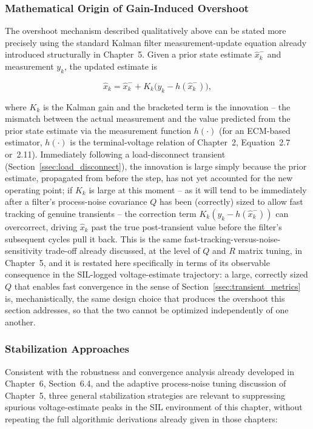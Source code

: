 \subsubsection{Mathematical Origin of Gain-Induced Overshoot}

The overshoot mechanism described qualitatively above can be stated more precisely using the standard Kalman filter measurement-update equation already introduced structurally in Chapter~5. Given a prior state estimate $\hat{x}_k^-$ and measurement $y_k$, the updated estimate is

\begin{equation}
	\hat{x}_k = \hat{x}_k^- + K_k \big(y_k - h(\hat{x}_k^-)\big),
	\label{eq:kf_update}
\end{equation}

\noindent where $K_k$ is the Kalman gain and the bracketed term is the innovation -- the mismatch between the actual measurement and the value predicted from the prior state estimate via the measurement function $h(\cdot)$ (for an ECM-based estimator, $h(\cdot)$ is the terminal-voltage relation of Chapter~2, Equation~2.7 or~2.11). Immediately following a load-disconnect transient (Section~\ref{ssec:load_disconnect}), the innovation is large simply because the prior estimate, propagated from before the step, has not yet accounted for the new operating point; if $K_k$ is large at this moment -- as it will tend to be immediately after a filter's process-noise covariance $Q$ has been (correctly) sized to allow fast tracking of genuine transients -- the correction term $K_k(y_k - h(\hat{x}_k^-))$ can overcorrect, driving $\hat{x}_k$ past the true post-transient value before the filter's subsequent cycles pull it back. This is the same fast-tracking-versus-noise-sensitivity trade-off already discussed, at the level of $Q$ and $R$ matrix tuning, in Chapter~5, and it is restated here specifically in terms of its observable consequence in the SIL-logged voltage-estimate trajectory: a large, correctly sized $Q$ that enables fast convergence in the sense of Section~\ref{ssec:transient_metrics} is, mechanistically, the same design choice that produces the overshoot this section addresses, so that the two cannot be optimized independently of one another.

\subsubsection{Stabilization Approaches}

Consistent with the robustness and convergence analysis already developed in Chapter~6, Section~6.4, and the adaptive process-noise tuning discussion of Chapter~5, three general stabilization strategies are relevant to suppressing spurious voltage-estimate peaks in the SIL environment of this chapter, without repeating the full algorithmic derivations already given in those chapters:

